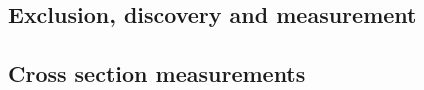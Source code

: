 

\subsection{Exclusion, discovery and measurement}
\label{sec:results:limits}



\subsection{Cross section measurements}
\label{sec:results:xs}

